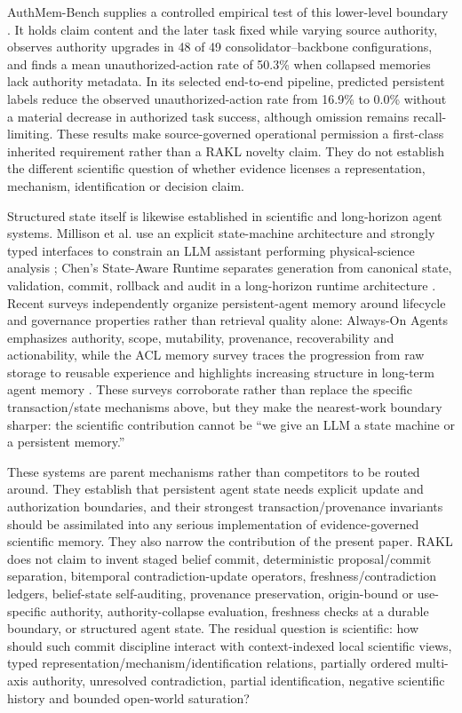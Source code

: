 AuthMem-Bench supplies a controlled empirical test of this lower-level boundary \cite{zhan2026authority}. It holds claim content and the later task fixed while varying source authority, observes authority upgrades in 48 of 49 consolidator--backbone configurations, and finds a mean unauthorized-action rate of 50.3\% when collapsed memories lack authority metadata. In its selected end-to-end pipeline, predicted persistent labels reduce the observed unauthorized-action rate from 16.9\% to 0.0\% without a material decrease in authorized task success, although omission remains recall-limiting. These results make source-governed operational permission a first-class inherited requirement rather than a RAKL novelty claim. They do not establish the different scientific question of whether evidence licenses a representation, mechanism, identification or decision claim.

Structured state itself is likewise established in scientific and long-horizon agent systems. Millison et al. use an explicit state-machine architecture and strongly typed interfaces to constrain an LLM assistant performing physical-science analysis \cite{millison2026}; Chen's State-Aware Runtime separates generation from canonical state, validation, commit, rollback and audit in a long-horizon runtime architecture \cite{chen2026stateaware}. Recent surveys independently organize persistent-agent memory around lifecycle and governance properties rather than retrieval quality alone: Always-On Agents emphasizes authority, scope, mutability, provenance, recoverability and actionability, while the ACL memory survey traces the progression from raw storage to reusable experience and highlights increasing structure in long-term agent memory \cite{ding2026alwayson,luo2026memorysurvey}. These surveys corroborate rather than replace the specific transaction/state mechanisms above, but they make the nearest-work boundary sharper: the scientific contribution cannot be ``we give an LLM a state machine or a persistent memory.''

These systems are parent mechanisms rather than competitors to be routed around. They establish that persistent agent state needs explicit update and authorization boundaries, and their strongest transaction/provenance invariants should be assimilated into any serious implementation of evidence-governed scientific memory. They also narrow the contribution of the present paper. RAKL does not claim to invent staged belief commit, deterministic proposal/commit separation, bitemporal contradiction-update operators, freshness/contradiction ledgers, belief-state self-auditing, provenance preservation, origin-bound or use-specific authority, authority-collapse evaluation, freshness checks at a durable boundary, or structured agent state. The residual question is scientific: how should such commit discipline interact with context-indexed local scientific views, typed representation/mechanism/identification relations, partially ordered multi-axis authority, unresolved contradiction, partial identification, negative scientific history and bounded open-world saturation?

